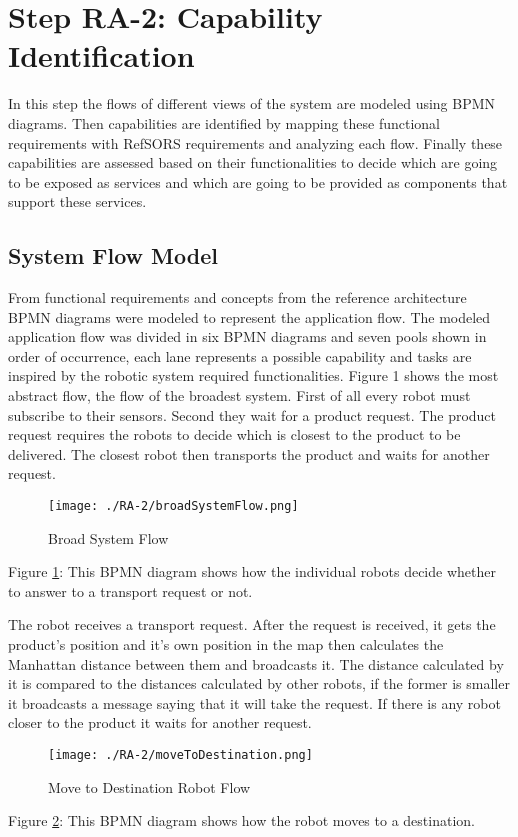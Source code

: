 \section{Step RA-2: Capability Identification}
In this step the flows of different views of the system are modeled using BPMN diagrams. Then capabilities are identified by mapping these functional requirements with RefSORS requirements and analyzing each flow. Finally these capabilities are assessed based on their functionalities to decide which are going to be exposed as services and which are going to be provided as components that support these services.

\subsection{System Flow Model}
From functional requirements and concepts from the reference architecture BPMN diagrams were modeled to represent the application flow. The modeled application flow was divided in six BPMN diagrams and seven pools shown in order of occurrence, each lane represents a possible capability and tasks are inspired by the robotic system required functionalities.
Figure 1 shows the most abstract flow, the flow of the broadest system. First of all every robot must subscribe to their sensors. Second they wait for a product request. The product request requires the robots to decide which is closest to the product to be delivered. The closest robot then transports the product and waits for another request.

\begin{figure}[ht!]
 \centering
 \texttt{[image: ./RA-2/broadSystemFlow.png]}
 \caption{Broad System Flow}
 \label{fig:broadsystemflow}
\end{figure}

Figure \ref{fig:broadsystemflow}: This BPMN diagram shows how the individual robots decide whether to answer to a transport request or not.

The robot receives a transport request. After the request is received, it gets the product's position and it's own position in the map then calculates the Manhattan distance between them and broadcasts it. The distance calculated by it is compared to the distances calculated by other robots, if the former is smaller it broadcasts a message saying that it will take the request. If there is any robot closer to the product it waits for another request.

\begin{figure}[ht!]
 \centering
 \texttt{[image: ./RA-2/moveToDestination.png]}
 \caption{Move to Destination Robot Flow}
 \label{fig:movetodestination}
\end{figure}
Figure \ref{fig:movetodestination}: This BPMN diagram shows how the robot moves to a destination.

